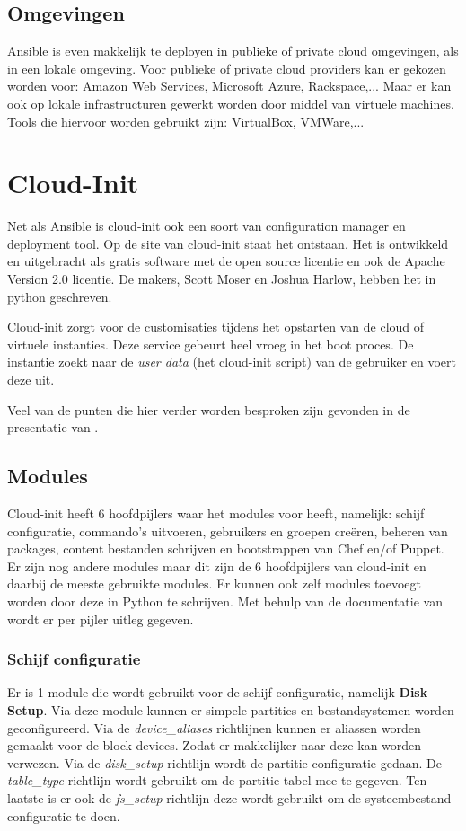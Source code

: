 \subsection{Omgevingen}
Ansible is even makkelijk te deployen in publieke of private cloud omgevingen, als in een lokale omgeving. Voor publieke of private cloud providers kan er gekozen worden voor: Amazon Web Services, Microsoft Azure, Rackspace,... Maar er kan ook op lokale infrastructuren gewerkt worden door middel van virtuele machines. Tools die hiervoor worden gebruikt zijn: VirtualBox, VMWare,...

\section{Cloud-Init}
Net als Ansible is cloud-init ook een soort van configuration manager en deployment tool. Op de site van cloud-init \autocite{cloudsite} staat het ontstaan. Het is ontwikkeld en uitgebracht als gratis software met de open source licentie en ook de Apache Version 2.0 licentie. De makers, Scott Moser en Joshua Harlow, hebben het in python geschreven.

Cloud-init zorgt  voor de customisaties tijdens het opstarten van de cloud of virtuele instanties. Deze service gebeurt heel vroeg in het boot proces. De instantie zoekt naar de \textit{user data} (het cloud-init script) van de gebruiker en voert deze uit. 

Veel van de punten die hier verder worden besproken zijn gevonden in de presentatie van \autocite{cloudred}.

\subsection{Modules}
Cloud-init heeft 6 hoofdpijlers waar het modules voor heeft, namelijk: schijf configuratie, commando's uitvoeren, gebruikers en groepen creëren, beheren van packages, content bestanden schrijven en bootstrappen van Chef en/of Puppet. Er zijn nog andere modules maar dit zijn de 6 hoofdpijlers van cloud-init en daarbij de meeste gebruikte modules. Er kunnen ook zelf modules toevoegt worden door deze in Python te schrijven. Met behulp van de documentatie van \autocite{clouddocs} wordt er per pijler uitleg gegeven.

\subsubsection{Schijf configuratie}
Er is 1 module die wordt gebruikt voor de schijf configuratie, namelijk \textbf{Disk Setup}. Via deze module kunnen er simpele partities en bestandsystemen worden geconfigureerd. Via de \textit{device\_aliases} richtlijnen kunnen er aliassen worden gemaakt voor de block devices. Zodat er makkelijker naar deze kan worden verwezen. Via de \textit{disk\_setup} richtlijn wordt de partitie configuratie gedaan. De \textit{table\_type} richtlijn wordt gebruikt om de partitie tabel mee te gegeven. Ten laatste is er ook de \textit{fs\_setup} richtlijn deze wordt gebruikt om de systeembestand configuratie te doen.

